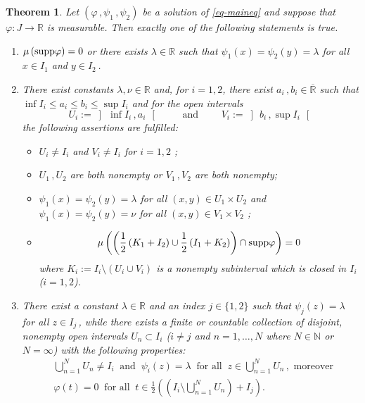\documentclass[12pt]{amsart}
\newtheorem{thm}{Theorem}
\theoremstyle{remark}
\theoremstyle{definition}
\newcommand{\NN}{\mathbb{N}}
\newcommand{\RR}{\mathbb{R}}
\newcommand{\RRx}{\overline{\mathbb{R}}}
\newcommand{\supp}{\mbox{\rm supp}}
\newcommand{\map}{\longrightarrow}
\begin{document}
\begin{thm}\label{thm-main_measurable}
Let 
$ \left( \varphi \,, \psi_1 \,, \psi_2 \right) $ 
be a solution of \eqref{eq-maineq} 
and suppose that 
$ \varphi : J \map \RR $  is measurable. 
Then exactly one of the following statements is true. 
\begin{enumerate} 
\item 
$ \mu \left( \supp \varphi \right) = 0 $ 
or there exists 
$ \lambda \in \RR $ such that 
$ \psi_1(x) = \psi_2(y) = \lambda $ 
for all 
$ x \in I_1 $ and $ y \in I_2 \,$. 
\item 
There exist constants 
$ \lambda, \nu \in \RR $ 
and, for $ i = 1,2 $, there exist 
$ a_i \,, b_i \in \RRx $ 
such that 
$ \inf I_i \leq a_i \leq b_i \leq \sup I_i $ 
and for the open intervals 
\[
U_i := \left] \, \inf I_i \,, a_i \, \right[ 
\qquad \mbox{ and } \qquad 
V_i := \left] \, b_i \,, \sup I_i \, \right[ 
\]
the following assertions are fulfilled: 
\begin{itemize}
\item 
$ U_i \neq I_i $ and $ V_i \neq I_i $ for $ i = 1,2 $ ; 
\item 
$ U_1 \,, U_2 $ are both nonempty or 
$ V_1 \,, V_2 $ are both nonempty; 
\item 
$ \psi_1 (x) =  \psi_2 (y) = \lambda $ for all 
$ (x,y) \in U_1 \times U_2 $ and 
$ \psi_1 (x) =  \psi_2 (y) = \nu $ for all 
$ (x,y) \in V_1 \times V_2 $ ; 
\item  
\[
\mu \left( \left( 
\frac{1}{2} \left( K_1 + I_2 \right) \cup 
\frac{1}{2} \left( I_1 + K_2 \right) \right)
\cap \supp  \varphi \right) = 0 
\] 
where 
$ K_i := I_i \setminus (U_i \cup V_i) $ 
is a nonempty subinterval 
which is closed in $ I_i $ ($ i=1,2 $). 
\end{itemize}

\item There exist a constant 
$ \lambda \in \RR $ and an index 
$ j \in \lbrace 1,2 \rbrace $ such that 
$ \psi_j(z) = \lambda $ for all $ z \in I_j \,$, 
while there exists a finite or countable collection of 
disjoint, nonempty open intervals 
$ U_n  \subset I_i $ 
($ i \neq j $ and $ n = 1, \dots, N $ 
where $ N \in \NN $ or $ N = \infty $) 
with the following properties: 
\begin{align*}
& \bigcup_{n=1}^N U_n \neq I_i 
\ \mbox{ and } \ \psi_i(z) = \lambda 
\ \mbox{ for all } \ z \in \bigcup_{n=1}^N U_n \,, 
\mbox{ moreover } \\  
& \varphi(t) = 0 \ \mbox{ for all } \ 
t \in \frac{1}{2} \left( 
\left( I_i \setminus \bigcup_{n=1}^N U_n \right) + I_j 
\right).  
\end{align*}
\end{enumerate} 
\end{thm}
\end{document}
